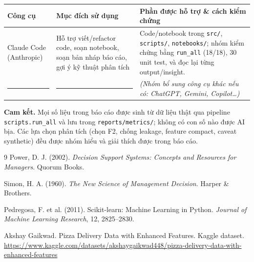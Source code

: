 \documentclass[12pt,a4paper,oneside]{report}
\newcommand{\code}[1]{\nolinkurl{#1}}
\begin{document}
\begin{table}[H]
\centering
\small
\begin{tabularx}{\textwidth}{p{3.0cm}p{4.2cm}X}
\toprule
\textbf{Công cụ} & \textbf{Mục đích sử dụng} & \textbf{Phần được hỗ trợ \& cách kiểm chứng}\\
\midrule
Claude Code (Anthropic) & Hỗ trợ viết/refactor code, soạn notebook, soạn bản
nháp báo cáo, gợi ý kỹ thuật phân tích & Code/notebook trong \code{src/},
\code{scripts/}, \code{notebooks/}; nhóm kiểm chứng bằng \code{run\_all} (18/18),
30 unit test, và đọc lại từng output/insight.\\
\rule{2.5cm}{0.4pt} & \rule{3.5cm}{0.4pt} & \emph{(Nhóm bổ sung công cụ khác nếu có: ChatGPT, Gemini, Copilot\ldots)}\\
\bottomrule
\end{tabularx}
\end{table}

\noindent\textbf{Cam kết.} Mọi số liệu trong báo cáo được sinh từ dữ liệu thật
qua pipeline \code{scripts.run\_all} và lưu trong \code{reports/metrics/};
không có con số nào được AI bịa. Các lựa chọn phân tích (chọn F2, chống leakage,
feature compact, caveat synthetic) đều được nhóm hiểu và giải thích được trong
báo cáo.

\begin{thebibliography}{9}
Power, D. J. (2002). \emph{Decision Support Systems: Concepts and Resources
for Managers}. Quorum Books.

Simon, H. A. (1960). \emph{The New Science of Management Decision}. Harper \&
Brothers.

Pedregosa, F. et al. (2011). Scikit-learn: Machine Learning in Python.
\emph{Journal of Machine Learning Research}, 12, 2825--2830.

Akshay Gaikwad. Pizza Delivery Data with Enhanced Features. Kaggle dataset.
\url{https://www.kaggle.com/datasets/akshaygaikwad448/pizza-delivery-data-with-enhanced-features}
\end{thebibliography}
\end{document}
